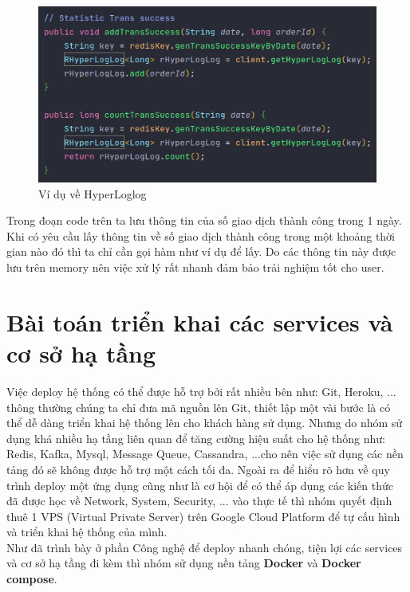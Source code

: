                 \begin{figure}[H]
			    \includegraphics[width=1\textwidth]{Images/hyperloglog.png}
			    \centering
			    \linebreak
			    \caption{Ví dụ về HyperLoglog}
	       	    \end{figure}
	       	
	       	    Trong đoạn code trên ta lưu thông tin của số giao dịch thành công trong 1 ngày. Khi có yêu cầu lấy thông tin về số giao dịch thành công trong một khoảng thời gian nào đó thì ta chỉ cần gọi hàm như ví dụ để lấy. Do các thông tin này được lưu trên memory nên việc xử lý rất nhanh đảm bảo trải nghiệm tốt cho user.
		  
		  \section{Bài toán triển khai các services và cơ sở hạ tầng}
		 
		  
		  Việc deploy hệ thống có thể được hỗ trợ bởi rất nhiều bên như: Git, Heroku, ... thông thường chúng ta chỉ đưa mã nguồn lên Git, thiết lập một vài bước là có thể dễ dàng triển khai hệ thống lên cho khách hàng sử dụng. Nhưng do nhóm sử dụng khá nhiều hạ tầng liên quan để tăng cường hiệu suất cho hệ thống như: Redis, Kafka, Mysql, Message Queue, Cassandra, ...cho nên việc sử dụng các nền tảng đó sẽ không được hỗ trợ một cách tối đa. Ngoài ra để hiểu rõ hơn về quy trình deploy một ứng dụng cũng như là cơ hội để có thể áp dụng các kiến thức đã được học về Network, System, Security, ... vào thực tế thì nhóm quyết định thuê 1 VPS (Virtual Private Server) trên Google Cloud Platform để tự cấu hình và triển khai hệ thống của mình.\\
		  
		  Như đã trình bày ở phần Công nghệ để deploy nhanh chóng, tiện lợi các services và cơ sở hạ tầng đi kèm thì nhóm sử dụng nền tảng \textbf{Docker} và \textbf{Docker compose}.
		  
